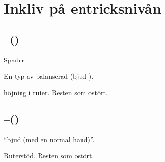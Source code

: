 

\section{Inkliv på entricksnivån}


\subsection{--()}

\bbe
\item[D] Spader
\item[\spa{1}] En typ av balanserad (bjud ).
\item[\NT{1}] höjning i ruter.
\ebe
Resten som ostört.

\subsection{--()}

\bbe
\item[Dubbelt] ``bjud  (med en normal hand)''. 
\item[\NT{1}] Ruterstöd.
\ebe
Resten som ostört.

